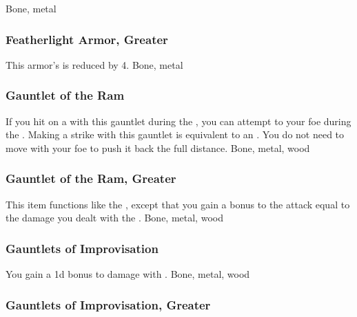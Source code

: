  Bone, metal
\lowercase{\hypertarget{item:Featherlight Armor, Greater}{}}\label{item:Featherlight Armor, Greater}
\hypertarget{item:Featherlight Armor, Greater}{\subsubsection{Featherlight Armor, Greater\hfill{}}}
This armor's  is reduced by 4.
 
 Bone, metal
\lowercase{\hypertarget{item:Gauntlet of the Ram}{}}\label{item:Gauntlet of the Ram}
\hypertarget{item:Gauntlet of the Ram}{\subsubsection{Gauntlet of the Ram\hfill{}}}
If you hit on a  with this gauntlet during the , you can attempt to  your foe during the .
Making a strike with this gauntlet is equivalent to an .
You do not need to move with your foe to push it back the full distance.
 
 Bone, metal, wood
\lowercase{\hypertarget{item:Gauntlet of the Ram, Greater}{}}\label{item:Gauntlet of the Ram, Greater}
\hypertarget{item:Gauntlet of the Ram, Greater}{\subsubsection{Gauntlet of the Ram, Greater\hfill{}}}
This item functions like the , except that you gain a bonus to the  attack equal to the damage you dealt with the .
 
 Bone, metal, wood
\lowercase{\hypertarget{item:Gauntlets of Improvisation}{}}\label{item:Gauntlets of Improvisation}
\hypertarget{item:Gauntlets of Improvisation}{\subsubsection{Gauntlets of Improvisation\hfill{}}}
You gain a \plus1d bonus to damage with .
 
 Bone, metal, wood
\lowercase{\hypertarget{item:Gauntlets of Improvisation, Greater}{}}\label{item:Gauntlets of Improvisation, Greater}
\hypertarget{item:Gauntlets of Improvisation, Greater}{\subsubsection{Gauntlets of Improvisation, Greater\hfill{}}}
